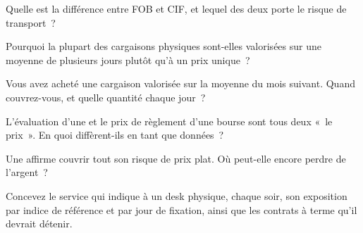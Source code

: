 \begin{interviewq}\label{iq:m3:physical-commodity-markets:1}
Quelle est la différence entre FOB et CIF, et lequel des deux porte le risque de transport~?
\end{interviewq}

\begin{interviewq}\label{iq:m3:physical-commodity-markets:2}
Pourquoi la plupart des cargaisons physiques sont-elles valorisées sur une moyenne de plusieurs jours
plutôt qu'à un prix unique~?
\end{interviewq}

\begin{interviewq}\label{iq:m3:physical-commodity-markets:3}
Vous avez acheté une cargaison valorisée sur la moyenne du mois suivant. Quand couvrez-vous,
et quelle quantité chaque jour~?
\end{interviewq}

\begin{interviewq}\label{iq:m3:physical-commodity-markets:4}
L'évaluation d'une  et le prix de règlement d'une bourse sont tous deux
«~le prix~». En quoi diffèrent-ils en tant que données~?
\end{interviewq}

\begin{interviewq}\label{iq:m3:physical-commodity-markets:5}
Une  affirme couvrir tout son risque de prix plat. Où peut-elle encore
perdre de l'argent~?
\end{interviewq}

\begin{interviewq}\label{iq:m3:physical-commodity-markets:6}
Concevez le service qui indique à un desk physique, chaque soir, son exposition par indice de référence
et par jour de fixation, ainsi que les contrats à terme qu'il devrait détenir.
\end{interviewq}
